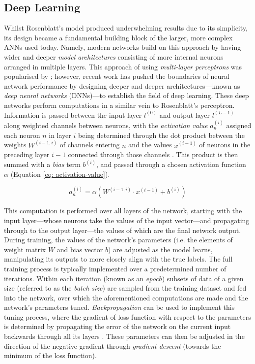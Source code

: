 \documentclass[a4paper, 11pt]{report}
\begin{document}
    \subsection{Deep Learning}

    Whilst Rosenblatt's model produced underwhelming results due to its simplicity, its design became a fundamental building block of the larger, more complex ANNs used today. Namely, modern networks build on this approach by having wider and deeper \emph{model architectures} consisting of more internal neurons arranged in multiple layers. This approach of using \emph{multi-layer perceptrons} was popularised by \citet{rumelhart-1986}; however, recent work has pushed the boundaries of neural network performance by designing deeper and deeper architectures---known as \emph{deep neural networks} (DNNs)---to establish the field of deep learning. These deep networks perform computations in a similar vein to Rosenblatt's perceptron. Information is passed between the input layer $l^{(0)}$ and output layer $l^{(L-1)}$ along weighted channels between neurons, with the \emph{activation value} $a^{(i)}_n$ assigned each neuron $n$ in layer $i$ being determined through the dot product between the weights $W^{(i-1, i)}$ of channels entering $n$ and the values $x^{(i-1)}$ of neurons in the preceding layer $i-1$ connected through those channels \citep{witten-2017}. This product is then summed with a \emph{bias} term $b^{(i)}$, and passed through a chosen activation function $\alpha$ (Equation \ref{eq: activation-value}).

    \begin{equation}
        \label{eq: activation-value}
        a^{(i)}_n = \alpha( W^{(i-1, i)} \cdot x^{(i-1)} + b^{(i)} )
    \end{equation}

    This computation is performed over all layers of the network, starting with the input layer---whose neurons take the values of the input vector---and propagating through to the output layer—the values of which are the final network output. During training, the values of the network's parameters (i.e. the elements of weight matrix $W$ and bias vector $b$) are adjusted as the model learns, manipulating its outputs to more closely align with the true labels. The full training process is typically implemented over a predetermined number of iterations. Within each iteration (known as an \emph{epoch}) subsets of data of a given size (referred to as the \emph{batch size}) are sampled from the training dataset and fed into the network, over which the aforementioned computations are made and the network's parameters tuned. \emph{Backpropagation} can be used to implement this tuning process, where the gradient of loss function with respect to the parameters is determined by propagating the error of the network on the current input backwards through all its layers \citep{zaras-2022}. These parameters can then be adjusted in the direction of the negative gradient through \emph{gradient descent} (towards the minimum of the loss function).
\end{document}
